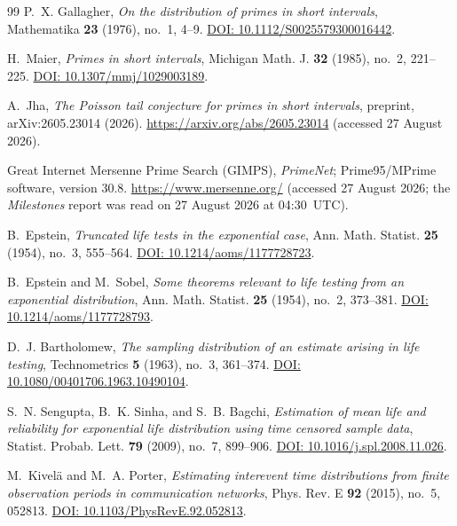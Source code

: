 \documentclass[11pt,a4paper]{article}
\theoremstyle{plain}
\theoremstyle{remark}
\begin{document}
\begin{thebibliography}{99}
 P.~X. Gallagher, \emph{On the distribution of primes in
short intervals}, Mathematika \textbf{23} (1976), no.~1, 4--9.
\href{https://doi.org/10.1112/S0025579300016442}{DOI:
10.1112/S0025579300016442}.

 H.~Maier, \emph{Primes in short intervals}, Michigan Math. J.
\textbf{32} (1985), no.~2, 221--225.
\href{https://doi.org/10.1307/mmj/1029003189}{DOI: 10.1307/mmj/1029003189}.

 A.~Jha, \emph{The Poisson tail conjecture for primes in short
intervals}, preprint, arXiv:2605.23014 (2026).
\url{https://arxiv.org/abs/2605.23014} (accessed 27 August 2026).

 Great Internet Mersenne Prime Search (GIMPS), \emph{PrimeNet};
Prime95/MPrime software, version 30.8. \url{https://www.mersenne.org/}
(accessed 27 August 2026; the \emph{Milestones} report was read on
27 August 2026 at 04:30~UTC).

 B.~Epstein, \emph{Truncated life tests in the
exponential case}, Ann. Math. Statist. \textbf{25} (1954), no.~3, 555--564.
\href{https://doi.org/10.1214/aoms/1177728723}{DOI: 10.1214/aoms/1177728723}.

 B.~Epstein and M.~Sobel, \emph{Some theorems
relevant to life testing from an exponential distribution}, Ann. Math. Statist.
\textbf{25} (1954), no.~2, 373--381.
\href{https://doi.org/10.1214/aoms/1177728793}{DOI: 10.1214/aoms/1177728793}.

 D.~J. Bartholomew, \emph{The sampling distribution of
an estimate arising in life testing}, Technometrics \textbf{5} (1963), no.~3,
361--374.
\href{https://doi.org/10.1080/00401706.1963.10490104}{DOI:
10.1080/00401706.1963.10490104}.

 S.~N. Sengupta, B.~K. Sinha, and S.~B. Bagchi,
\emph{Estimation of mean life and reliability for exponential life distribution
using time censored sample data}, Statist. Probab. Lett. \textbf{79} (2009),
no.~7, 899--906.
\href{https://doi.org/10.1016/j.spl.2008.11.026}{DOI:
10.1016/j.spl.2008.11.026}.

 M.~Kivel\"{a} and M.~A. Porter, \emph{Estimating interevent
time distributions from finite observation periods in communication networks},
Phys. Rev. E \textbf{92} (2015), no.~5, 052813.
\href{https://doi.org/10.1103/PhysRevE.92.052813}{DOI:
10.1103/PhysRevE.92.052813}.


\end{thebibliography}
\end{document}

